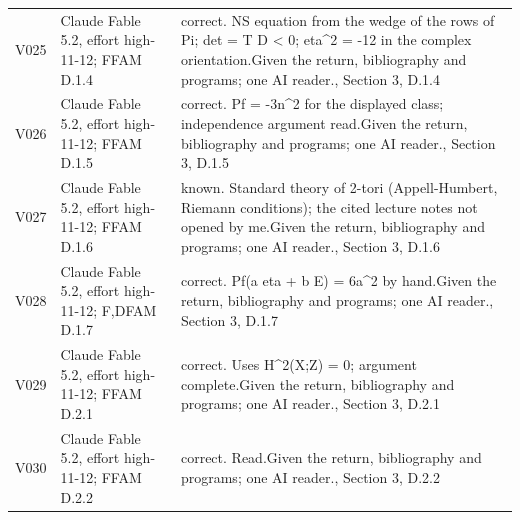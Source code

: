 \documentclass[11pt,a4paper]{article}
\theoremstyle{plain}
\theoremstyle{definition}
\begin{document}
\begin{longtable}{@{}L{.08\linewidth}L{.31\linewidth}L{.56\linewidth}@{}}
V025 & Claude Fable 5.2, effort high-11-12; F\newline FAM D.1.4 & correct. NS equation from the wedge of the rows of Pi; det = T D < 0; eta\textasciicircum{}2 = -12 in the complex orientation.\newline Given the return, bibliography and programs; one AI reader.\newline {}, Section 3, D.1.4\\
V026 & Claude Fable 5.2, effort high-11-12; F\newline FAM D.1.5 & correct. Pf = -3n\textasciicircum{}2 for the displayed class; independence argument read.\newline Given the return, bibliography and programs; one AI reader.\newline {}, Section 3, D.1.5\\
V027 & Claude Fable 5.2, effort high-11-12; F\newline FAM D.1.6 & known. Standard theory of 2-tori (Appell-Humbert, Riemann conditions); the cited lecture notes not opened by me.\newline Given the return, bibliography and programs; one AI reader.\newline {}, Section 3, D.1.6\\
V028 & Claude Fable 5.2, effort high-11-12; F,D\newline FAM D.1.7 & correct. Pf(a eta + b E) = 6a\textasciicircum{}2 by hand.\newline Given the return, bibliography and programs; one AI reader.\newline {}, Section 3, D.1.7\\
V029 & Claude Fable 5.2, effort high-11-12; F\newline FAM D.2.1 & correct. Uses H\textasciicircum{}2(X;Z) = 0; argument complete.\newline Given the return, bibliography and programs; one AI reader.\newline {}, Section 3, D.2.1\\
V030 & Claude Fable 5.2, effort high-11-12; F\newline FAM D.2.2 & correct. Read.\newline Given the return, bibliography and programs; one AI reader.\newline {}, Section 3, D.2.2\\

\end{longtable}
\end{document}
